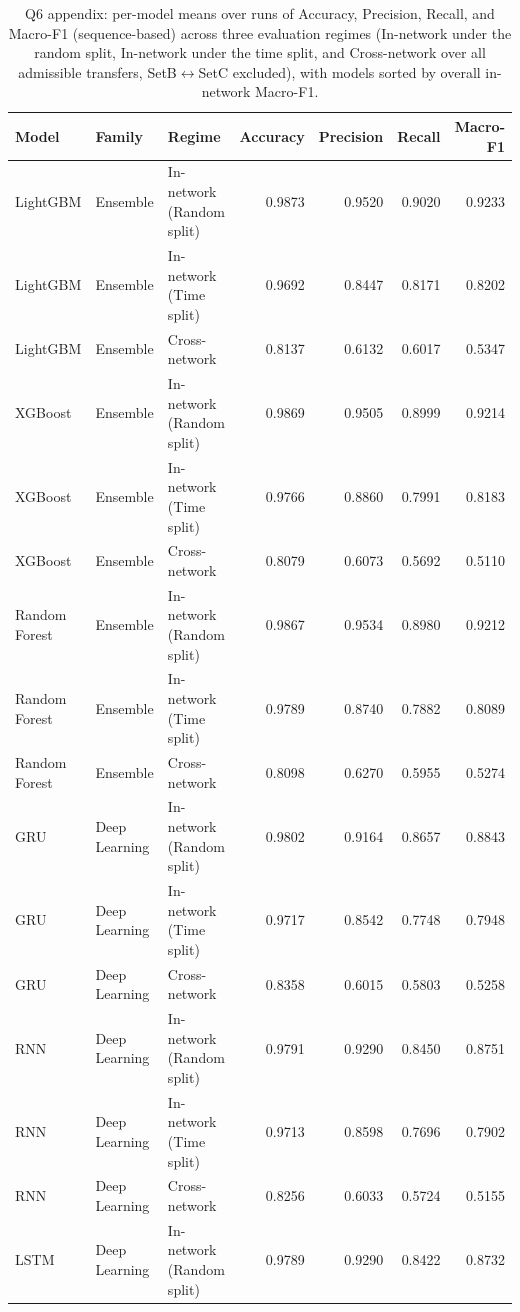 \begin{table}
\caption{Q6 appendix: per-model means over runs of Accuracy, Precision, Recall, and Macro-F1 (sequence-based) across three evaluation regimes (In-network under the random split, In-network under the time split, and Cross-network over all admissible transfers, SetB$\leftrightarrow$SetC excluded), with models sorted by overall in-network Macro-F1.}
\label{tab:q6_appendix_per_model}
\begin{tabular}{lllrrrr}
\toprule
Model & Family & Regime & Accuracy & Precision & Recall & Macro-F1 \\
\midrule
LightGBM & Ensemble & In-network (Random split) & 0.9873 & 0.9520 & 0.9020 & 0.9233 \\
LightGBM & Ensemble & In-network (Time split) & 0.9692 & 0.8447 & 0.8171 & 0.8202 \\
LightGBM & Ensemble & Cross-network & 0.8137 & 0.6132 & 0.6017 & 0.5347 \\
XGBoost & Ensemble & In-network (Random split) & 0.9869 & 0.9505 & 0.8999 & 0.9214 \\
XGBoost & Ensemble & In-network (Time split) & 0.9766 & 0.8860 & 0.7991 & 0.8183 \\
XGBoost & Ensemble & Cross-network & 0.8079 & 0.6073 & 0.5692 & 0.5110 \\
Random Forest & Ensemble & In-network (Random split) & 0.9867 & 0.9534 & 0.8980 & 0.9212 \\
Random Forest & Ensemble & In-network (Time split) & 0.9789 & 0.8740 & 0.7882 & 0.8089 \\
Random Forest & Ensemble & Cross-network & 0.8098 & 0.6270 & 0.5955 & 0.5274 \\
GRU & Deep Learning & In-network (Random split) & 0.9802 & 0.9164 & 0.8657 & 0.8843 \\
GRU & Deep Learning & In-network (Time split) & 0.9717 & 0.8542 & 0.7748 & 0.7948 \\
GRU & Deep Learning & Cross-network & 0.8358 & 0.6015 & 0.5803 & 0.5258 \\
RNN & Deep Learning & In-network (Random split) & 0.9791 & 0.9290 & 0.8450 & 0.8751 \\
RNN & Deep Learning & In-network (Time split) & 0.9713 & 0.8598 & 0.7696 & 0.7902 \\
RNN & Deep Learning & Cross-network & 0.8256 & 0.6033 & 0.5724 & 0.5155 \\
LSTM & Deep Learning & In-network (Random split) & 0.9789 & 0.9290 & 0.8422 & 0.8732 \\

\end{tabular}
\end{table}
